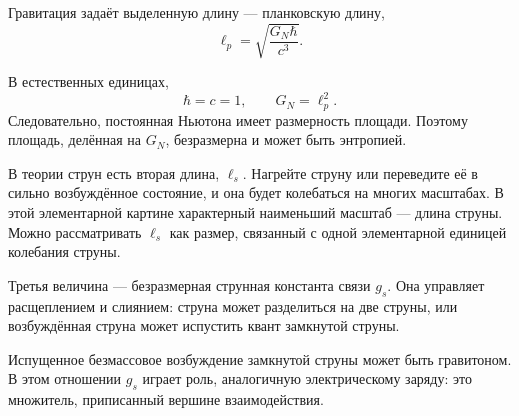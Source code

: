 Гравитация задаёт выделенную длину — планковскую длину,
\begin{equation}
\ell_p=\sqrt{\frac{G_N\hbar}{c^3}}.
\label{eq:l06-planck-si}
\end{equation}

\begin{classroomqa}
\end{classroomqa}

В естественных единицах,
\begin{equation}
\hbar=c=1,
\qquad
G_N=\ell_p^2.
\label{eq:l06-planck-area}
\end{equation}
Следовательно, постоянная Ньютона имеет размерность площади. Поэтому площадь, делённая на \(G_N\), безразмерна и может быть энтропией.

В теории струн есть вторая длина, \(\ell_s\). Нагрейте струну или переведите её в сильно возбуждённое состояние, и она будет колебаться на многих масштабах. В этой элементарной картине характерный наименьший масштаб — длина струны. Можно рассматривать \(\ell_s\) как размер, связанный с одной элементарной единицей колебания струны.

Третья величина — безразмерная струнная константа связи \(g_s\). Она управляет расщеплением и слиянием: струна может разделиться на две струны, или возбуждённая струна может испустить квант замкнутой струны.

\begin{classroomqa}
\end{classroomqa}

Испущенное безмассовое возбуждение замкнутой струны может быть гравитоном. В этом отношении \(g_s\) играет роль, аналогичную электрическому заряду: это множитель, приписанный вершине взаимодействия.

